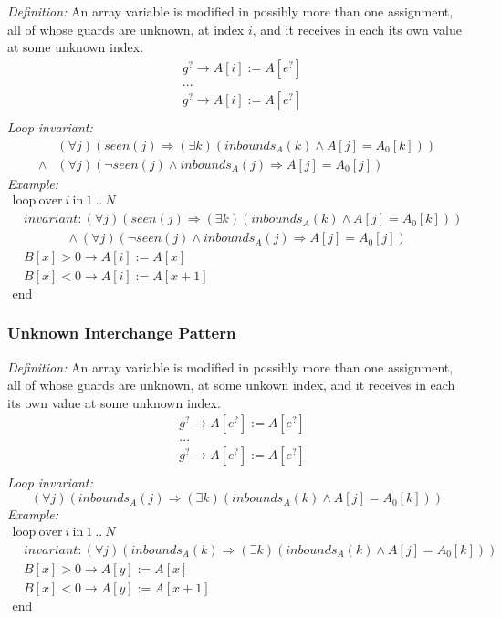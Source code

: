 \documentclass[a4paper,10pt]{article}
\newcommand{\idx}{\ensuremath{i}\xspace}
\newcommand{\KWloop}{\ensuremath{\mathrm{loop}~}}
\newcommand{\KWend}{\ensuremath{\mathrm{end}~}}
\newcommand{\KWover}{\ensuremath{\mathrm{over}~}}
\newcommand{\KWin}{\ensuremath{~\mathrm{in}~}}
\newcommand{\impl}{\ensuremath{\Longrightarrow}}
\newcommand{\inbounds}[2]{\ensuremath{\mathit{inbounds}_{#1}(#2)}\xspace}
\newcommand{\seen}[1]{\ensuremath{\mathit{seen}(#1)}\xspace}
\newcommand{\loopinvariant}{\noindent\textit{Loop invariant:}\xspace}
\newcommand{\patterndef}{\noindent\textit{Definition:}\xspace}
\newcommand{\patternexample}{\noindent\textit{Example:}\xspace}
\begin{document}
\patterndef An array variable is modified in possibly more than one assignment,
all of whose guards are unknown, at index \idx, and it receives in each
its own value at some unknown index.
%
\begin{eqnarray*}
&g^? \rightarrow A[\idx] := A[e^?]\\
&...\\
&g^? \rightarrow A[\idx] := A[e^?]\\
\end{eqnarray*}
%
\loopinvariant
%
\begin{eqnarray*}
&(\forall j)(\seen{j} \impl (\exists k)(\inbounds{A}{k} \land A[j] = A_0[k])) \\
\land&
(\forall j)(\neg \seen{j} \land \inbounds{A}{j} \impl A[j] = A_0[j])
\end{eqnarray*}
%
\patternexample
$$\begin{array}{l}
  \KWloop \KWover i \KWin 1~..~N \\
  ~~~~ \textit{invariant}: (\forall j)(\seen{j} \impl (\exists k)(\inbounds{A}{k} \land A[j] = A_0[k]))\\
  ~~~~~~~~~~~~~~~~~~~ \land (\forall j)(\neg \seen{j} \land \inbounds{A}{j} \impl A[j] = A_0[j])\\
  ~~~~ B[x] > 0 \rightarrow A[i] := A[x]\\
  ~~~~ B[x] < 0 \rightarrow A[i] := A[x+1]\\
  \KWend
\end{array}$$

\subsubsection*{Unknown Interchange Pattern}

\patterndef An array variable is modified in possibly more than one assignment,
all of whose guards are unknown, at some unkown index, and it receives in each
its own value at some unknown index.
%
\begin{eqnarray*}
&g^? \rightarrow A[e^?] := A[e^?]\\
&...\\
&g^? \rightarrow A[e^?] := A[e^?]\\
\end{eqnarray*}
%
\loopinvariant
%
$$(\forall j)(\inbounds{A}{j} \impl (\exists k)(\inbounds{A}{k} \land A[j] = A_0[k])) $$
%
\patternexample
$$\begin{array}{l}
  \KWloop \KWover i \KWin 1~..~N \\
  ~~~~ \textit{invariant}: (\forall j)(\inbounds{A}{k} \impl (\exists k)(\inbounds{A}{k} \land A[j] = A_0[k]))\\
  ~~~~ B[x] > 0 \rightarrow A[y] := A[x]\\
  ~~~~ B[x] < 0 \rightarrow A[y] := A[x+1]\\
  \KWend
\end{array}$$
\end{document}
